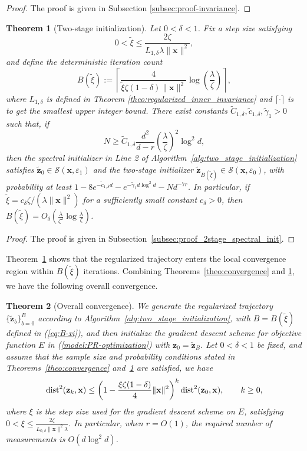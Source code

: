 \documentclass{article}
\renewcommand{\eqref}[1]{(\ref{#1})}
\newcommand{\calS}{{\mathcal S}}
\newcommand{\dist}{{\rm dist}}
\newcommand{\vx}{{\mathbf x}}
\newcommand{\vz}{{\mathbf z}}
\newcommand{\0}{{\mathbf 0}}
\newtheorem{theorem}{Theorem}[section]
\numberwithin{equation}{section}
\begin{document}
	\begin{proof}
		The proof is given in Subsection \ref{subsec:proof-invariance}.
	\end{proof}
	\begin{theorem}[Two-stage initialization]
		\label{theo:good_initialization_2stage}
		Let $0<\delta<1$. Fix a step size satisfying
		\[
		0<\widetilde\xi\le\frac{2\zeta}{ L_{1,\delta}\lambda\|\vx\|^2},
		\]
		and define the deterministic iteration count
		\begin{equation}\label{eq:B-xi}
			B(\widetilde\xi):=\left\lceil\frac{4}{\widetilde\xi\zeta(1-\delta)\|\vx\|^2}\log\!\left(\frac{\lambda}{\zeta}\right)\right\rceil,
		\end{equation}
		where $L_{1,\delta}$ is defined in Theorem \ref{theo:regularized_inner_invariance} and   $\lceil\cdot\rceil$ is to get the smallest upper integer bound. There exist constants $\widetilde C_{1,\delta},\widetilde c_{1,\delta},\widetilde\gamma_1>0$ such that, if
		\[
		N\ge \widetilde C_{1,\delta}\frac{d^2}{d-r}\left(\frac{\lambda}{\zeta}\right)^2\log^2d,
		\]
		then the spectral initializer in Line 2 of Algorithm~\ref{alg:two_stage_initialization} satisfies $\widetilde\vz_0\in\calS(\vx,\varepsilon_1)$ and the two-stage initializer $\widetilde\vz_{B(\widetilde\xi)}\in\calS(\vx,\varepsilon_0)$, with probability at least $1-8e^{-\widetilde c_{1,\delta}d}-e^{-\widetilde\gamma_1d\log^2d}-Nd^{-7r}$.  In particular, if $\widetilde\xi=c_\delta\zeta/(\lambda\|\vx\|^2)$ for a sufficiently small constant $c_\delta>0$, then
		$B(\widetilde\xi)=O_\delta\!\left(\frac{\lambda}{\zeta^2}\log\frac{\lambda}{\zeta}\right)$.
	\end{theorem}
	\begin{proof}
		The proof is given in Subsection~\ref{subsec:proof_2stage_spectral_init}.
	\end{proof}
	Theorem~\ref{theo:good_initialization_2stage} shows that the regularized trajectory enters the local convergence region within $B(\widetilde\xi)$ iterations. Combining Theorems~\ref{theo:convergence} and \ref{theo:good_initialization_2stage}, we have the following overall convergence.
	
	\begin{theorem}[Overall convergence]
		\label{theo:overall_convergence}
		We generate the regularized trajectory $\{\widetilde{\vz}_b\}_{b=0}^B$ according to Algorithm~\ref{alg:two_stage_initialization}, with $B=B(\widetilde\xi)$ defined in \eqref{eq:B-xi}, and then initialize the gradient descent scheme for objective function $E$ in \eqref{model:PR-optimization} with $\vz_0 = \widetilde{\vz}_B$. Let $0<\delta<1$  be fixed, and assume that the sample size and probability conditions stated in Theorems~\ref{theo:convergence} and~\ref{theo:good_initialization_2stage} are satisfied, we have 
		\[
		\dist^2(\vz_k,\vx)\le\left(1-\frac{\xi\zeta(1-\delta)}4\|\vx\|^2\right)^k\dist^2(\vz_0,\vx),\qquad k\ge0,
		\]
		where $\xi$ is the step size used for the gradient descent scheme on $E$, satisfying
		$
		0<\xi\le
		\frac{2\zeta}{L_{0,\delta}\|\vx\|^2\lambda}$. 
		In particular, when $r=O(1)$, the required number of measurements is $O(d\log^2d)$.
	\end{theorem}	
\end{document}

